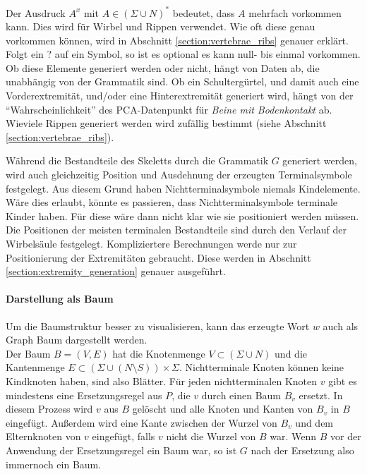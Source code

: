 Der Ausdruck $A^x$ mit $A \in (\Sigma \cup N)^*$ bedeutet, dass $A$ mehrfach vorkommen kann. Dies wird für Wirbel und Rippen verwendet. Wie oft diese genau vorkommen können, wird in Abschnitt \ref{section:vertebrae_ribs} genauer erklärt.
Folgt ein ? auf ein Symbol, so ist es optional \dash es kann null- bis einmal vorkommen. Ob diese Elemente generiert werden oder nicht, hängt von Daten ab, die unabhängig von der Grammatik sind. Ob ein Schultergürtel, und damit auch eine Vorderextremität, und/oder eine Hinterextremität generiert wird, hängt von der "`Wahrscheinlichkeit"' des PCA-Datenpunkt für \emph{Beine mit Bodenkontakt} ab. Wieviele Rippen generiert werden wird zufällig bestimmt (siehe Abschnitt \ref{section:vertebrae_ribs}).

Während die Bestandteile des Skeletts durch die Grammatik $G$ generiert werden, wird auch gleichzeitig Position und Ausdehnung der erzeugten Terminalsymbole festgelegt.  Aus diesem Grund haben Nichtterminalsymbole niemals Kindelemente. Wäre dies erlaubt, könnte es passieren, dass Nichtterminalsymbole terminale Kinder haben. Für diese wäre dann nicht klar wie sie positioniert werden müssen.\\
Die Positionen der meisten terminalen Bestandteile sind durch den Verlauf der Wirbelsäule festgelegt. Kompliziertere Berechnungen werde nur zur Positionierung der Extremitäten gebraucht. Diese werden in Abschnitt \ref{section:extremity_generation} genauer ausgeführt.


\paragraph{Darstellung als Baum}
Um die Baumstruktur besser zu visualisieren, kann das erzeugte Wort $w$ auch als Graph \bzw Baum dargestellt werden.\\
Der Baum $B = (V, E)$ hat die Knotenmenge $V \subset (\Sigma \cup N)$ und die Kantenmenge $E \subset (\Sigma \cup (N \setminus S)) \times \Sigma$. Nichtterminale Knoten können keine Kindknoten haben, sind also Blätter. Für jeden nichtterminalen Knoten $v$ gibt es mindestens eine Ersetzungsregel aus $P$, die $v$ durch einen Baum $B_v$ ersetzt. In diesem Prozess wird $v$ aus $B$ gelöscht und alle Knoten und Kanten von $B_v$ in $B$ eingefügt. Außerdem wird eine Kante zwischen der Wurzel von $B_v$ und dem Elternknoten von $v$ eingefügt, falls $v$ nicht die Wurzel von $B$ war. Wenn $B$ vor der Anwendung der Ersetzungsregel ein Baum war, so ist $G$ nach der Ersetzung also immernoch ein Baum.

